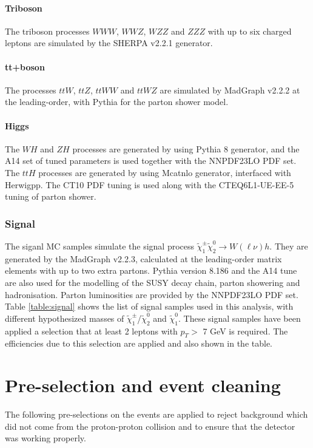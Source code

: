 \paragraph{\bf Triboson}
The triboson processes $WWW$, $WWZ$, $WZZ$ and $ZZZ$ with up to six charged leptons are simulated by the {\sc SHERPA} v2.2.1 generator.

\paragraph{\bf tt+boson}
The processes $ttW$, $ttZ$, $ttWW$ and $ttWZ$ are simulated by {\sc MadGraph} v2.2.2 at the leading-order, with {\sc Pythia} for the parton shower model.

\paragraph{\bf Higgs}
The $WH$ and $ZH$ processes are generated by using {\sc Pythia} 8 generator, and the {\sc A14} set of tuned parameters is used together with the {\sc NNPDF23LO} PDF set.
The $ttH$ processes are generated by using {\sc Mcatnlo} generator, interfaced with {\sc Herwigpp}.
The CT10 PDF tuning is used along with the CTEQ6L1-UE-EE-5 tuning of parton shower.

\subsubsection{Signal}
The siganl MC samples simulate the signal process $\tilde{\chi}_1^\pm \tilde{\chi}_2^0 \rightarrow W(\ell\nu)h$.
They are generated by the {\sc MadGraph} v2.2.3, calculated at the leading-order matrix elements with up to two extra partons.
{\sc Pythia} version 8.186 and the A14 tune are also used for the modelling of the SUSY decay chain, parton showering and hadronisation.
Parton luminosities are provided by the NNPDF23LO PDF set.
Table \ref{table:signal} shows the list of signal samples used in this analysis, with different hypothesized masses of $\tilde{\chi}^{\pm}_{1}$/$\tilde{\chi}^{0}_{2}$ and $\tilde{\chi}^{0}_{1}$.
These signal samples have been applied a selection that at least 2 leptons with $p_{T} >$ 7 GeV is required.
The efficiencies due to this selection are applied and also shown in the table.

\section{Pre-selection and event cleaning}
The following pre-selections on the events are applied to reject background which did not come from the proton-proton collision and to ensure that the detector was working properly.

